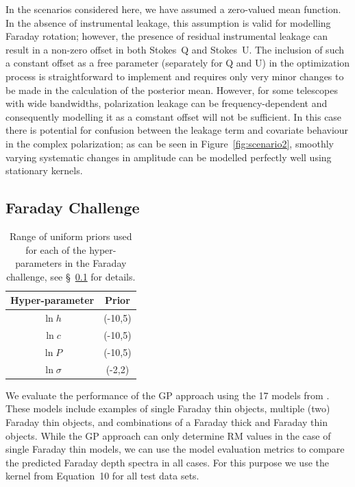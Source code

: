 \documentclass[fleqn,usenatbib]{mnras}
\begin{document}
In the scenarios considered here, we have assumed a zero-valued mean function. In the absence of instrumental leakage, this assumption is valid for modelling Faraday rotation; however, the presence of residual instrumental leakage can result in a non-zero offset in both Stokes~Q and Stokes~U. The inclusion of such a constant offset as a free parameter (separately for Q and U) in the optimization process is straightforward to implement and requires only very minor changes to be made in the calculation of the posterior mean. However, for some telescopes with wide bandwidths, polarization leakage can be frequency-dependent and consequently modelling it as a comstant offset will not be sufficient. In this case there is potential for confusion between the leakage term and covariate behaviour in the complex polarization; as can be seen in Figure~\ref{fig:scenario2}, smoothly varying systematic changes in amplitude can be modelled perfectly well using stationary kernels.

\subsection{Faraday Challenge}
\label{sec:challenges}

%
\begin{table}
\caption{\label{tab:challengepriors} Range of uniform priors used for each of the hyper-parameters in the Faraday challenge, see \S~\ref{sec:challenges} for details.}
\centering
\begin{tabular}{|c|c|}
\hline
Hyper-parameter & Prior \\\hline
$\ln h$ & (-10,5)\\
$\ln c$ & (-10,5)\\
$\ln P$ & (-10,5)\\
$\ln \sigma$ & (-2,2)\\\hline
\end{tabular}
\end{table}
%
We evaluate the performance of the GP approach using the 17 models from \cite{Sun_2015}. These models include examples of single Faraday thin objects, multiple (two) Faraday thin objects, and combinations of a Faraday thick and Faraday thin objects. While the GP approach can only determine RM values in the case of single Faraday thin models, we can use the model evaluation metrics to compare the predicted Faraday depth spectra in all cases. For this purpose we use the kernel from Equation~10 for all test data sets. 
\end{document}
